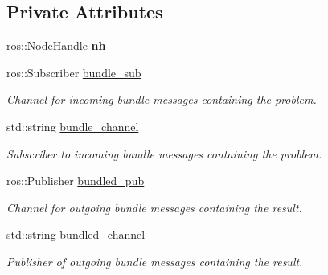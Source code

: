 \subsection*{Private Attributes}
\begin{DoxyCompactItemize}
\item 
\mbox{\label{classBundleAdjuster_a8c5244bc2bb628671e4ec1ae7223d48b}} 
ros\+::\+Node\+Handle {\bfseries nh}
\item 
\mbox{\label{classBundleAdjuster_a13bf648cbda845ad9e2e967044466a2b}} 
ros\+::\+Subscriber \hyperlink{classBundleAdjuster_a13bf648cbda845ad9e2e967044466a2b}{bundle\+\_\+sub}
\begin{DoxyCompactList}\small\item\em Channel for incoming bundle messages containing the problem. \end{DoxyCompactList}\item 
\mbox{\label{classBundleAdjuster_aa7fc095e5a139823d29e0fecc49a70ae}} 
std\+::string \hyperlink{classBundleAdjuster_aa7fc095e5a139823d29e0fecc49a70ae}{bundle\+\_\+channel}
\begin{DoxyCompactList}\small\item\em Subscriber to incoming bundle messages containing the problem. \end{DoxyCompactList}\item 
\mbox{\label{classBundleAdjuster_a20004f81ad40cf5a0f8d33bfc844ff1d}} 
ros\+::\+Publisher \hyperlink{classBundleAdjuster_a20004f81ad40cf5a0f8d33bfc844ff1d}{bundled\+\_\+pub}
\begin{DoxyCompactList}\small\item\em Channel for outgoing bundle messages containing the result. \end{DoxyCompactList}\item 
\mbox{\label{classBundleAdjuster_a5b25d46bd77478007054b980e7923278}} 
std\+::string \hyperlink{classBundleAdjuster_a5b25d46bd77478007054b980e7923278}{bundled\+\_\+channel}
\begin{DoxyCompactList}\small\item\em Publisher of outgoing bundle messages containing the result. \end{DoxyCompactList}\item 

\end{DoxyCompactItemize}
